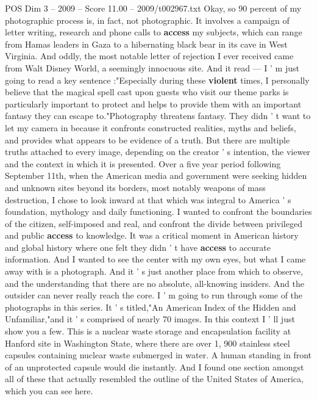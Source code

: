 \begin{textsample}{POS Dim 3 – 2009 – Score 11.00 – 2009/t002967.txt}  \label{ex:f3_pos_054}
Okay, so 90 percent of my photographic process is, in fact, not photographic.
It involves a campaign of letter writing, research and phone calls to \textbf{access} my subjects, which can range from Hamas leaders in Gaza to a hibernating black bear in its cave in West Virginia.
And oddly, the most notable letter of rejection I ever received came from Walt Disney World, a seemingly innocuous site.
And it read — I ' m just going to read a key sentence :"Especially during these \textbf{violent} times, I personally believe that the magical spell cast upon guests who visit our theme parks is particularly important to protect and helps to provide them with an important fantasy they can escape to."Photography threatens fantasy.
They didn ' t want to let my camera in because it confronts constructed realities, myths and beliefs, and provides what appears to be evidence of a truth.
But there are multiple truths attached to every image, depending on the creator ' s intention, the viewer and the context in which it is presented.
Over a five year period following September 11th, when the American media and government were seeking hidden and unknown sites beyond its borders, most notably weapons of mass destruction, I chose to look inward at that which was integral to America ' s foundation, mythology and daily functioning.
I wanted to confront the boundaries of the citizen, self-imposed and real, and confront the divide between privileged and public \textbf{access} to knowledge.
It was a critical moment in American history and global history where one felt they didn ' t have \textbf{access} to accurate information.
And I wanted to see the center with my own eyes, but what I came away with is a photograph.
And it ' s just another place from which to observe, and the understanding that there are no absolute, all-knowing insiders.
And the outsider can never really reach the core.
I ' m going to run through some of the photographs in this series.
It ' s titled,"An American Index of the Hidden and Unfamiliar,"and it ' s comprised of nearly 70 images.
In this context I ' ll just show you a few.
This is a nuclear waste storage and encapsulation facility at Hanford site in Washington State, where there are over 1, 900 stainless steel capsules containing nuclear waste submerged in water.
A human standing in front of an unprotected capsule would die instantly.
And I found one section amongst all of these that actually resembled the outline of the United States of America, which you can see here.

\end{textsample}

